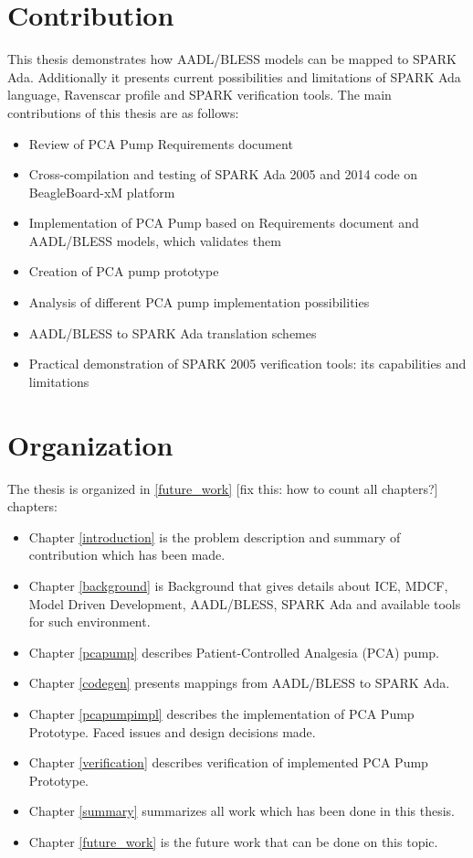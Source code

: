 \section{Contribution}
\label{introduction:contribution}
This thesis demonstrates how AADL/BLESS models can be mapped to SPARK Ada. Additionally it presents current possibilities and limitations of SPARK Ada language, Ravenscar profile and SPARK verification tools. The main contributions of this thesis are as follows:
\begin{itemize}
	\item Review of PCA Pump Requirements document \cite{OpenSourcePCAPump:Paper}
	\item Cross-compilation and testing of SPARK Ada 2005 and 2014 code on BeagleBoard-xM platform
	\item Implementation of PCA Pump based on Requirements document \cite{OpenSourcePCAPump:Paper} and AADL/BLESS models, which validates them
	\item Creation of PCA pump prototype
	\item Analysis of different PCA pump implementation possibilities
	\item AADL/BLESS to SPARK Ada translation schemes
	\item Practical demonstration of SPARK 2005 verification tools: its capabilities and limitations
\end{itemize}


\section{Organization}
\label{introduction:organization}
The thesis is organized in \ref{future_work} [fix this: how to count all chapters?] chapters:
\begin{itemize}
	\item Chapter \ref{introduction} is the problem description and summary of contribution which has been made. 
	\item Chapter \ref{background} is Background that gives details about ICE, MDCF, Model Driven Development, AADL/BLESS, SPARK Ada and available tools for such environment. 
	\item Chapter \ref{pcapump} describes Patient-Controlled Analgesia (PCA) pump.
	\item Chapter \ref{codegen} presents mappings from AADL/BLESS to SPARK Ada. 
	\item Chapter \ref{pcapumpimpl} describes the implementation of PCA Pump Prototype. Faced issues and design decisions made.
	\item Chapter \ref{verification} describes verification of implemented PCA Pump Prototype. 
	\item Chapter \ref{summary} summarizes all work which has been done in this thesis. 
	\item Chapter \ref{future_work} is the future work that can be done on this topic.
\end{itemize}



